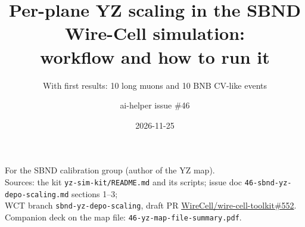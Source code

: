 \documentclass[aspectratio=169,10pt]{beamer}
\title{Per-plane YZ scaling in the SBND Wire-Cell simulation:\\workflow and how to run it}
\subtitle{With first results: 10 long muons and 10 BNB CV-like events}
\author{ai-helper issue \#46}
\date{2026-11-25}
\newcommand{\code}[1]{\texttt{#1}}
\begin{document}
\begin{frame}
\titlepage
\vspace{-6mm}
\begin{center}\footnotesize\color{gray}
For the SBND calibration group (author of the YZ map).\\
Sources: the kit \code{yz-sim-kit/README.md} and its scripts; issue doc
\code{46-sbnd-yz-depo-scaling.md} sections 1--3;\\
WCT branch \code{sbnd-yz-depo-scaling}, draft PR \href{https://github.com/WireCell/wire-cell-toolkit/pull/552}{WireCell/wire-cell-toolkit\#552}. Companion deck on the map file:
\code{46-yz-map-file-summary.pdf}.
\end{center}
\end{frame}
\end{document}
